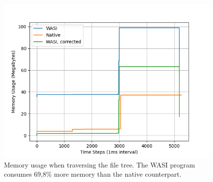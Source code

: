 \begin{figure}[H]
  \centering
  \includegraphics[width=1\textwidth]{images/mass_storage_memory_filetree_with_correction.png}
  \caption{Memory usage when traversing the file tree. The \acrshort{WASI} program consumes 69,8\% more memory than the native counterpart.}
  \label{fig:mass_storage_file_tree_comparison}
\end{figure}
